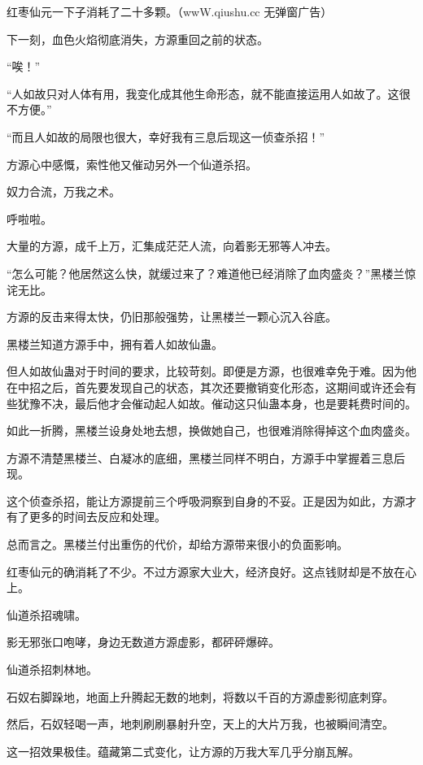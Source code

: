 
\begin{this_body}

红枣仙元一下子消耗了二十多颗。（wwW.qiushu.cc 无弹窗广告）

下一刻，血色火焰彻底消失，方源重回之前的状态。

“唉！”

“人如故只对人体有用，我变化成其他生命形态，就不能直接运用人如故了。这很不方便。”

“而且人如故的局限也很大，幸好我有三息后现这一侦查杀招！”

方源心中感慨，索性他又催动另外一个仙道杀招。

奴力合流，万我之术。

呼啦啦。

大量的方源，成千上万，汇集成茫茫人流，向着影无邪等人冲去。

“怎么可能？他居然这么快，就缓过来了？难道他已经消除了血肉盛炎？”黑楼兰惊诧无比。

方源的反击来得太快，仍旧那般强势，让黑楼兰一颗心沉入谷底。

黑楼兰知道方源手中，拥有着人如故仙蛊。

但人如故仙蛊对于时间的要求，比较苛刻。即便是方源，也很难幸免于难。因为他在中招之后，首先要发现自己的状态，其次还要撤销变化形态，这期间或许还会有些犹豫不决，最后他才会催动起人如故。催动这只仙蛊本身，也是要耗费时间的。

如此一折腾，黑楼兰设身处地去想，换做她自己，也很难消除得掉这个血肉盛炎。

方源不清楚黑楼兰、白凝冰的底细，黑楼兰同样不明白，方源手中掌握着三息后现。

这个侦查杀招，能让方源提前三个呼吸洞察到自身的不妥。正是因为如此，方源才有了更多的时间去反应和处理。

总而言之。黑楼兰付出重伤的代价，却给方源带来很小的负面影响。

红枣仙元的确消耗了不少。不过方源家大业大，经济良好。这点钱财却是不放在心上。

仙道杀招魂啸。

影无邪张口咆哮，身边无数道方源虚影，都砰砰爆碎。

仙道杀招刺林地。

石奴右脚跺地，地面上升腾起无数的地刺，将数以千百的方源虚影彻底刺穿。

然后，石奴轻喝一声，地刺刷刷暴射升空，天上的大片万我，也被瞬间清空。

这一招效果极佳。蕴藏第二式变化，让方源的万我大军几乎分崩瓦解。


\end{this_body}
